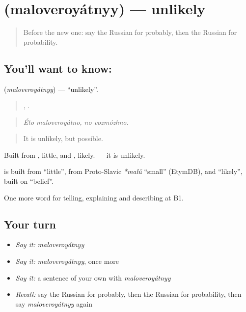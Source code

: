 \section[\texorpdfstring{\ru{маловероятный} (maloveroyátnyy)}{маловероятный (maloveroyátnyy)}]{ (maloveroyátnyy) — unlikely}

\label{lesson:RU-C372-maloveroyatnyy}



\begin{quote}
Before the new one: say the Russian for probably, then the Russian for probability.
\end{quote}

\subsection*{You'll want to know: }
\textbf{} (\emph{maloveroyátnyy}) — \textquotedblleft{}unlikely\textquotedblright{}.

\begin{quote}
 ,  .
\end{quote}

\begin{quote}
\emph{Éto maloveroyátno, no vozmózhno.}
\end{quote}

\begin{quote}
It is unlikely, but possible.
\end{quote}

Built from \emph{}, little, and \emph{}, likely. \emph{} — it is unlikely.

\begin{cousinweb}
\textbf{} is built from \emph{} \textquotedblleft{}little\textquotedblright{}, from Proto-Slavic \emph{*malŭ} \textquotedblleft{}small\textquotedblright{} (EtymDB), and \emph{} \textquotedblleft{}likely\textquotedblright{}, built on \emph{} \textquotedblleft{}belief\textquotedblright{}.
\end{cousinweb}

\begin{grammarlens}[title={What you've built}]
One more word for telling, explaining and describing at B1.
\end{grammarlens}

\subsection*{Your turn}
\begin{itemize}
\raggedright
  \item \emph{Say it:} \emph{maloveroyátnyy}
  \item \emph{Say it:} \emph{maloveroyátnyy}, once more
  \item \emph{Say it:} a sentence of your own with \emph{maloveroyátnyy}
  \item \emph{Recall:} say the Russian for probably, then the Russian for probability, then say \emph{maloveroyátnyy} again
\end{itemize}

